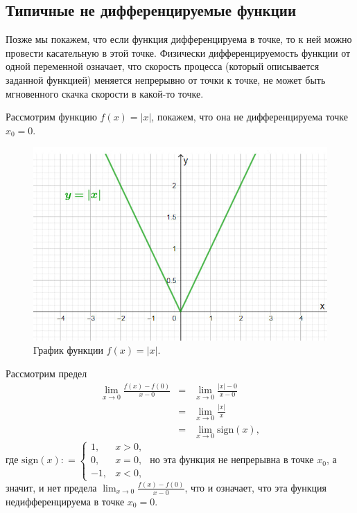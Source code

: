 \subsection{Типичные не дифференцируемые функции}

Позже мы покажем, что если функция дифференцируема в точке, то к ней можно провести касательную в этой точке. Физически дифференцируемость функции от одной переменной означает, что скорость процесса (который описывается заданной функцией) меняется непрерывно от точки к точке, \ie не может быть мгновенного скачка скорости в какой-то точке.

\begin{example}\label{|x|is_not_diff}
    Рассмотрим функцию $f(x) = |x|$, покажем, что она не дифференцируема точке $x_0 =0$.

\begin{figure}
    \centering
    \includegraphics{images/abs(x).jpg}
    \caption{График функции $f(x) = |x|.$}
    \label{fig:enter-label}
\end{figure}
    
    Рассмотрим предел
    \begin{eqnarray*}
        \lim_{x \to 0}\frac{f(x) - f(0)}{x - 0} &=& \lim_{x \to 0} \frac{|x| - 0}{x-0} \\
        &=&\lim_{x \to 0} \frac{|x|}{x}\\
        &=& \lim_{x \to 0}\mathrm{sign}(x),
    \end{eqnarray*}
    где $\mathrm{sign}(x) : = \begin{cases}
        1, & x > 0, \\
        0, & x =0, \\
        -1 , & x <0,
    \end{cases}$
    но эта функция не непрерывна в точке $x_0$, а значит, и нет предела $\lim_{x \to 0}\frac{f(x) - f(0)}{x - 0}$, что и означает, что эта функция недифференцируема в точке $x_0 = 0.$

\end{example}

